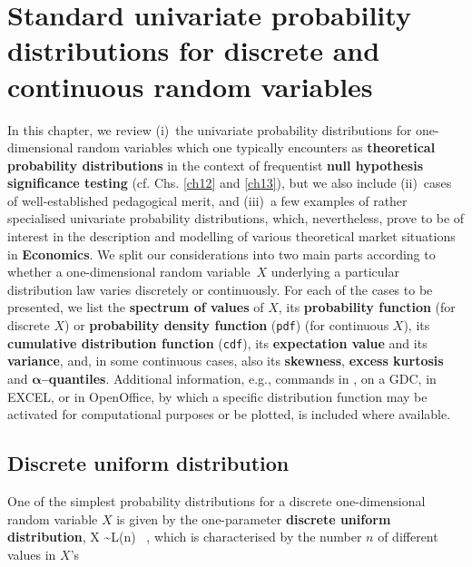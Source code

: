 \chapter[Standard univariate probability distributions]{Standard 
univariate probability distributions for discrete and continuous 
random variables}
In this chapter, we review (i)~the univariate probability 
distributions for one-dimensional random variables which one
typically encounters as \textbf{theoretical probability
distributions} in the context of frequentist \textbf{null
hypothesis significance testing} (cf. Chs. \ref{ch12}
and \ref{ch13}), but we also include
(ii)~cases of well-established pedagogical merit, and (iii)~a few
examples of rather specialised univariate probability
distributions, which, nevertheless, prove to be of interest in the description and modelling of various theoretical market situations
in \textbf{Economics}. We split our considerations into two main
parts according to whether a one-dimensional random variable~$X$
underlying a particular distribution law varies discretely or
continuously. For each of the cases to be presented, we list the
\textbf{spectrum of values} of $X$, its \textbf{probability
function} (for discrete $X$) or \textbf{probability density
function} (\texttt{pdf}) (for continuous $X$), its
\textbf{cumulative distribution function} (\texttt{cdf}), its
\textbf{expectation value} and its \textbf{variance}, and, in some
continuous cases, also its \textbf{skewness}, \textbf{excess
kurtosis} and $\boldsymbol{\alpha}$\textbf{--quantiles}. Additional information, e.g., commands in \R, on a GDC, in EXCEL, or in
OpenOffice, by which a specific distribution function may be
activated for computational purposes or be plotted, is included
where available.

\section[Discrete uniform distribution]{Discrete uniform
distribution}
One of the simplest probability distributions for a discrete 
one-dimensional random variable $X$ is given by the one-parameter 
\textbf{discrete uniform distribution},
%
\be
X \sim L(n) \ ,
\ee
%
which is characterised by the number $n$ of different values in 
$X$'s

